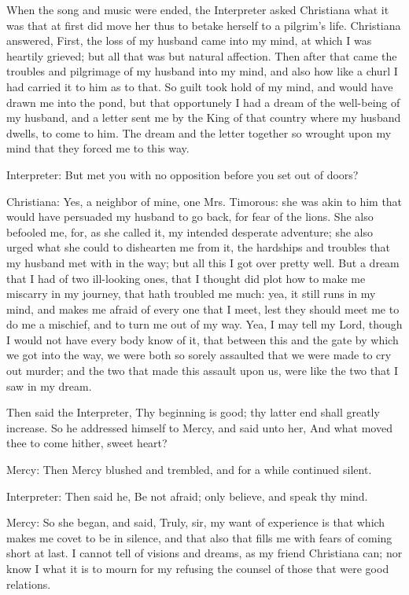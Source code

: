 When the song and music were ended, the Interpreter asked Christiana what it was that at first did move her thus to betake herself to a pilgrim's life. Christiana answered, First, the loss of my husband came into my mind, at which I was heartily grieved; but all that was but natural affection. Then after that came the troubles and pilgrimage of my husband into my mind, and also how like a churl I had carried it to him as to that. So guilt took hold of my mind, and would have drawn me into the pond, but that opportunely I had a dream of the well-being of my husband, and a letter sent me by the King of that country where my husband dwells, to come to him. The dream and the letter together so wrought upon my mind that they forced me to this way.

Interpreter: But met you with no opposition before you set out of doors?

Christiana: Yes, a neighbor of mine, one Mrs. Timorous: she was akin to him that would have persuaded my husband to go back, for fear of the lions. She also befooled me, for, as she called it, my intended desperate adventure; she also urged what she could to dishearten me from it, the hardships and troubles that my husband met with in the way; but all this I got over pretty well. But a dream that I had of two ill-looking ones, that I thought did plot how to make me miscarry in my journey, that hath troubled me much: yea, it still runs in my mind, and makes me afraid of every one that I meet, lest they should meet me to do me a mischief, and to turn me out of my way. Yea, I may tell my Lord, though I would not have every body know of it, that between this and the gate by which we got into the way, we were both so sorely assaulted that we were made to cry out murder; and the two that made this assault upon us, were like the two that I saw in my dream.

Then said the Interpreter, Thy beginning is good; thy latter end shall greatly increase. So he addressed himself to Mercy, and said unto her, And what moved thee to come hither, sweet heart?

Mercy: Then Mercy blushed and trembled, and for a while continued silent.

Interpreter: Then said he, Be not afraid; only believe, and speak thy mind.

Mercy: So she began, and said, Truly, sir, my want of experience is that which makes me covet to be in silence, and that also that fills me with fears of coming short at last. I cannot tell of visions and dreams, as my friend Christiana can; nor know I what it is to mourn for my refusing the counsel of those that were good relations.

